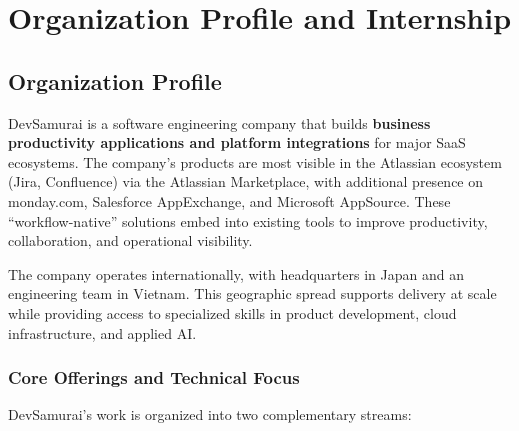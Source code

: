\chapter{Organization Profile and Internship}
\label{ch:OrgProfile}


\section{Organization Profile}
\label{sec:OrgProfile_Profile}

DevSamurai \cite{DevSamurai_Website} is a software engineering company that builds \textbf{business productivity applications and platform integrations} for major SaaS ecosystems. The company's products are most visible in the Atlassian ecosystem (Jira, Confluence) via the Atlassian Marketplace, with additional presence on monday.com, Salesforce AppExchange, and Microsoft AppSource. These ``workflow-native'' solutions embed into existing tools to improve productivity, collaboration, and operational visibility.

The company operates internationally, with headquarters in Japan and an engineering team in Vietnam. This geographic spread supports delivery at scale while providing access to specialized skills in product development, cloud infrastructure, and applied AI.

\subsection{Core Offerings and Technical Focus}
\label{subsec:OrgProfile_CoreOfferings}

DevSamurai's work is organized into two complementary streams:

